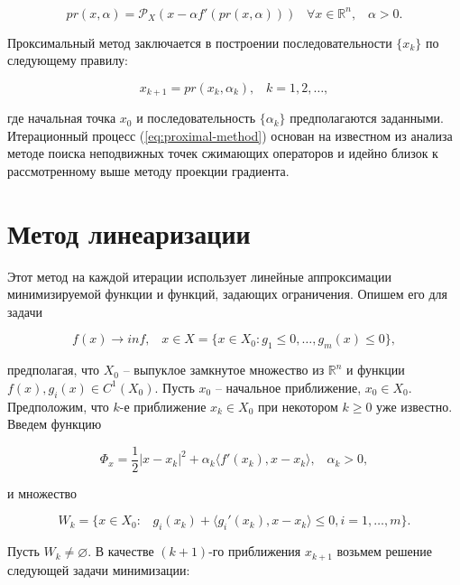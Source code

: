 \documentclass[a4paper, 12pt, titlepage]{article}
\theoremstyle{definition}
\theoremstyle{plain}
\theoremstyle{plain}
\begin{document}
\begin{equation}
 pr(x, \alpha) = \mathcal{P}_{X}(x - \alpha f'(pr(x, \alpha))) \;\;\;
 \forall x \in \mathbb{R}^{n}, \;\;\; \alpha > 0.
\end{equation}

Проксимальный метод заключается в построении последовательности $\{x_{k}\}$ по
следующему правилу:

\begin{equation}
 \label{eq:proximal-method}
 x_{k + 1} = pr(x_{k}, \alpha_{k}), \;\;\; k = 1, 2, \ldots,
\end{equation}

где начальная точка $x_{0}$ и последовательность $\{\alpha_{k}\}$
предполагаются заданными. Итерационный процесс (\ref{eq:proximal-method})
основан на известном из анализа методе поиска неподвижных точек сжимающих
операторов и идейно близок к рассмотренному выше методу проекции градиента.

\section{Метод линеаризации}

Этот метод на каждой итерации использует линейные аппроксимации минимизируемой
функции и функций, задающих ограничения. Опишем его для задачи

\begin{equation}
 f(x) \to inf, \;\;\;
 x \in X  = \{x \in X_{0}: g_{1} \leq 0, \ldots, g_{m}(x) \leq 0\},
\end{equation}

предполагая, что $X_{0}$ -- выпуклое замкнутое множество из $\mathbb{R}^{n}$
и функции $f(x), g_{i}(x) \in C^{1}(X_{0})$. Пусть $x_{0}$ -- начальное
приближение, $x_{0} \in X_{0}$. Предположим, что $k$-е приближение
$x_{k} \in X_{0}$ при некотором $k \geq 0$ уже известно. Введем функцию

\begin{equation}
 \Phi_{x} = \frac{1}{2} |x - x_{k}|^{2} +
 \alpha_{k} \langle f'(x_{k}), x - x_{k} \rangle, \;\;\; \alpha_{k} > 0, 
\end{equation}

и множество

\begin{equation}
 W_{k} = \{x \in X_{0}: \;\;\;
 g_{i}(x_{k}) + \langle g_{i}'(x_{k}), x - x_{k} \rangle \leq 0,
 i = 1, \ldots, m \}.
\end{equation}

Пусть $W_{k} \neq \varnothing$. В качестве $(k + 1)$-го приближения $x_{k + 1}$
возьмем решение следующей задачи минимизации:
\end{document}
